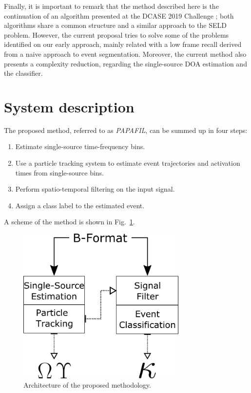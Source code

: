 Finally, it is important to remark that the method described here is the continuation of an algorithm presented at the DCASE 2019 Challenge \cite{perez2019hybrid}; both algorithms share a common structure and a similar approach to the SELD problem. 
However, the current proposal tries to solve some of the problems identified on our early approach, mainly related with a low frame recall derived from a naive approach to event segmentation. Moreover, the current method also presents a complexity reduction, regarding the single-source 
DOA estimation and the classifier. 


\section{System description}
\label{sec:methodology}

The proposed method, referred to as \textit{PAPAFIL}, can be summed up in four steps:

\begin{enumerate}
    \item Estimate single-source time-frequency bins.
    \item Use a particle tracking system to estimate event trajectories and activation times from single-source bins.
    \item Perform spatio-temporal filtering on the input signal.
    \item Assign a class label to the estimated event.
\end{enumerate}

A scheme of the method is shown in Fig.~\ref{fig:scheme}.

\begin{figure}[th!]
  \centering
  \centerline{\includegraphics[width=0.75\textwidth]{Figures/SELD/ARCH.png}}
  \caption{Architecture of the proposed methodology.}
  \label{fig:scheme}
\end{figure}


